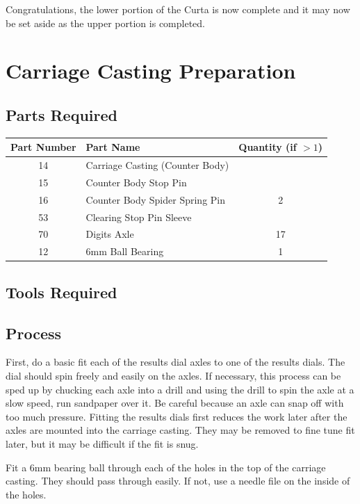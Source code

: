 \documentclass[openany]{book}
\begin{document}
Congratulations, the lower portion of the Curta is now complete and it may now be set aside as the upper portion is completed.





\chapter{Carriage Casting Preparation}
\section{Parts Required}
\begin{table}[!ht]
	\centering
	\begin{tabular}{clc}
		Part Number & Part Name & Quantity (if $>1$) \\ \hline
		14 & Carriage Casting (Counter Body) & \\
		15 & Counter Body Stop Pin & \\
		16 & Counter Body Spider Spring Pin & 2 \\
		53 & Clearing Stop Pin Sleeve & \\
		70 & Digits Axle & 17 \\ \hline \hline
		12 & 6mm Ball Bearing & 1
	\end{tabular}
\end{table}

\section{Tools Required}

\section{Process}
First, do a basic fit each of the results dial axles to one of the results dials. The dial should spin freely and easily on the axles. If necessary, this process can be sped up by chucking each axle into a drill and using the drill to spin the axle at a slow speed, run sandpaper over it. Be careful because an axle can snap off with too much pressure. Fitting the results dials first reduces the work later after the axles are mounted into the carriage casting. They may be removed to fine tune fit later, but it may be difficult if the fit is snug.

Fit a 6mm bearing ball through each of the holes in the top of the carriage casting. They should pass through easily. If not, use a needle file on the inside of the holes.
\end{document}
